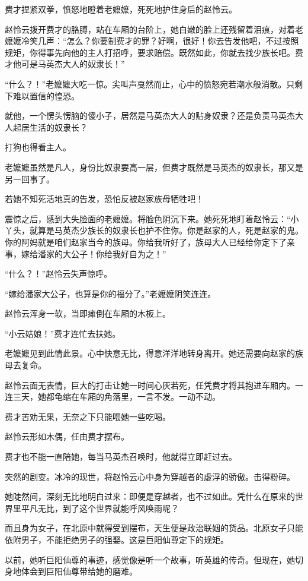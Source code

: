 \begin{this_body}
费才捏紧双拳，愤怒地瞪着老嬷嬷，死死地护住身后的赵怜云。

赵怜云拨开费才的胳膊，站在车厢的台阶上，她白嫩的脸上还残留着泪痕，对着老嬷嬷冷笑几声：“怎么？你要制费才的罪？好啊，很好！你去告发他吧，不过按照规矩，你得事先向他的主人打招呼，要求赔偿。既然如此，你就去找少族长吧。费才他可是马英杰大人的奴隶长！”

“什么？！”老嬷嬷大吃一惊。尖叫声戛然而止，心中的愤怒宛若潮水般消散。只剩下难以置信的惶恐。

就他，一个愣头愣脑的傻小子，居然是马英杰大人的贴身奴隶？还是负责马英杰大人起居生活的奴隶长？

打狗也得看主人。

老嬷嬷虽然是凡人，身份比奴隶要高一层，但费才既然是马英杰的奴隶长，那又是另一回事了。

若她不知死活地真的告发，恐怕反被赵家族母牺牲吧！

震惊之后，感到大失脸面的老嬷嬷。将脸色阴沉下来。她死死地盯着赵怜云：“小丫头，就算是马英杰少族长的奴隶长也护不住你。你是赵家的人，死是赵家的鬼。你的阿妈就是咱们赵家当今的族母。你给我听好了，族母大人已经给你定下了亲事，嫁给潘家的大公子！你给我好自为之！”

“什么？！”赵怜云失声惊呼。

“嫁给潘家大公子，也算是你的福分了。”老嬷嬷阴笑连连。

赵怜云浑身一软，当即瘫倒在车厢的木板上。

“小云姑娘！”费才连忙去扶她。

老嬷嬷见到此情此景。心中快意无比，得意洋洋地转身离开。她还需要向赵家的族母去复命。

赵怜云面无表情，巨大的打击让她一时间心灰若死，任凭费才将其抱进车厢内。一连三天，她都龟缩在车厢的角落里，一言不发。一动不动。

费才苦劝无果，无奈之下只能喂她一些吃喝。

赵怜云形如木偶，任由费才摆布。

费才也不能一直陪她，每当马英杰召唤时，他就得立即赶过去。

突然的剧变。冰冷的现世，将赵怜云心中身为穿越者的虚浮的骄傲。击得粉碎。

她陡然间，深刻无比地明白过来：即便是穿越者，也不过如此。凭什么在原来的世界里平凡无比，到了这个世界就能呼风唤雨呢？

而且身为女子，在北原中就得受到摆布，天生便是政治联姻的货品。北原女子只能依附男子，不能拒绝男子的强娶。这是巨阳仙尊定下的规矩。

以前，她听巨阳仙尊的事迹，感觉像是听一个故事，听英雄的传奇。但现在，她切身地体会到巨阳仙尊带给她的磨难。


\end{this_body}
